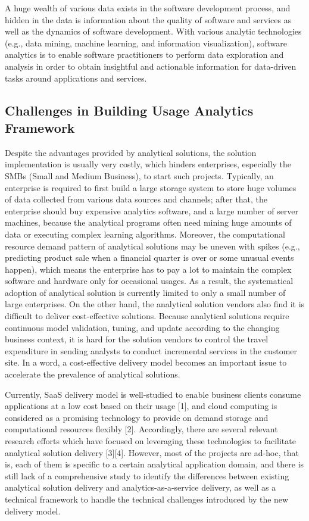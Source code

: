A huge wealth of various data exists in the software development process, and hidden in the data is information about the quality of software and services as well as the dynamics of software development. With various analytic technologies (e.g., data mining, machine learning, and information visualization), software analytics is to enable software practitioners to perform data exploration and analysis in order to obtain insightful and actionable information for data-driven tasks around applications and services.

\subsection{Challenges in Building Usage Analytics Framework}

Despite the advantages provided by analytical solutions, the solution implementation is usually very costly, which hinders enterprises, especially the SMBs (Small and Medium Business), to start such projects. Typically, an enterprise is required to first build a large storage system to store huge volumes of data collected from various data sources and channels; after that, the enterprise should buy expensive analytics software, and a large number of server machines, because the analytical programs often need mining huge amounts of data or executing complex learning algorithms. Moreover, the computational resource demand pattern of analytical solutions may be uneven with spikes (e.g., predicting product sale when a financial quarter is over or some unusual events happen), which means the enterprise has to pay a lot to maintain the complex software and hardware only for occasional usages. As a result, the systematical adoption of analytical
solution is currently limited to only a small number of large enterprises. On the other hand, the analytical solution vendors also find it is difficult to deliver cost-effective solutions. Because analytical solutions require continuous model validation,
tuning, and update according to the changing business context, it is hard for the solution vendors to control the
travel expenditure in sending analysts to conduct incremental services in the customer site. In a word, a cost-effective delivery model becomes an important issue to accelerate the prevalence of analytical solutions. 

Currently, SaaS delivery model is well-studied to enable business clients consume applications at a low cost based on their usage [1], and cloud computing is considered as a promising technology to provide on demand storage and computational resources flexibly [2]. Accordingly, there are several relevant research efforts which have focused on
leveraging these technologies to facilitate analytical solution delivery [3][4]. However, most of the projects are ad-hoc, that is, each of them is specific to a certain analytical application domain, and there is still lack of a comprehensive study to identify the differences between existing analytical solution delivery and analytics-as-a-service delivery, as well as a technical framework to handle the technical challenges introduced by the new delivery model.

